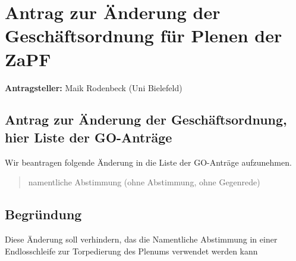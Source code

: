\documentclass[draft,12pt,oneside]{scrartcl}
\begin{document}
\section*{Antrag zur Änderung der Geschäftsordnung für Plenen der ZaPF}

\textbf{Antragsteller:} Maik Rodenbeck (Uni Bielefeld)

\subsection*{Antrag zur Änderung der Geschäftsordnung, hier Liste der GO-Anträge}

Wir beantragen folgende Änderung in die Liste der GO-Anträge aufzunehmen.

\begin{quote}
namentliche Abstimmung (ohne Abstimmung, ohne Gegenrede)
\end{quote}

\subsection*{Begründung}

Diese Änderung soll verhindern, das die Namentliche Abstimmung in einer Endlosschleife zur Torpedierung des Plenums verwendet werden kann
\end{document}
